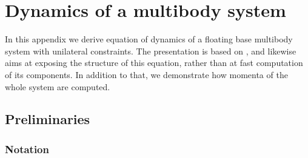 \chapter{Dynamics of a multibody system}
\label{app.dynamics}
\acresetall

In this appendix we derive equation of dynamics of a floating base multibody
system with unilateral constraints. The presentation is based on
\cite{Wieber2006fastmotions}, and likewise aims at exposing the structure of
this equation, rather than at fast computation of its components. In addition
to that, we demonstrate how momenta of the whole system are computed.



\section{Preliminaries}

\subsection{Notation}

